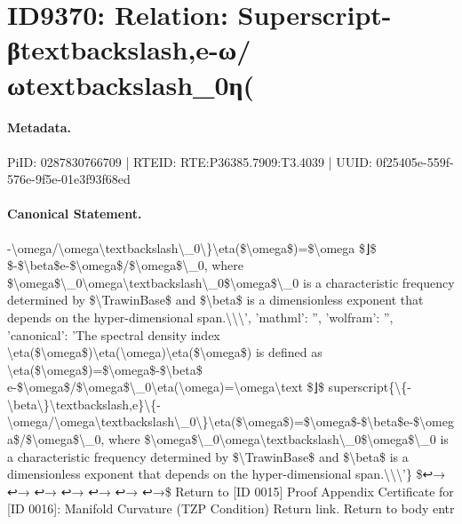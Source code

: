 \section*{ID9370: Relation: Superscript-βtextbackslash,e-ω/ωtextbackslash\_0η(}
\paragraph{Metadata.}
PiID: 0287830766709 | RTEID: RTE:P36385.7909:T3.4039 | UUID: 0f25405e-559f-576e-9f5e-01e3f93f68ed

\paragraph{Canonical Statement.}
-\textbackslash{}omega/\textbackslash{}omega\textbackslash{}textbackslash\textbackslash{}\_0\textbackslash{}\}\textbackslash{}eta(\$\textbackslash{}omega\$)=\$\textbackslash{}omega \$⌋\$ \$-\$\textbackslash{}beta\$e-\$\textbackslash{}omega\$/\$\textbackslash{}omega\$\textbackslash{}\_0, where \$\textbackslash{}omega\$\textbackslash{}\_0\textbackslash{}omega\textbackslash{}textbackslash\textbackslash{}\_0\$\textbackslash{}omega\$\textbackslash{}\_0 is a characteristic frequency determined by \$\textbackslash{}TrawinBase\$ and \$\textbackslash{}beta\$ is a dimensionless exponent that depends on the hyper-dimensional span.\textbackslash{}\textbackslash{}\textbackslash{}', 'mathml': '', 'wolfram': '', 'canonical': 'The spectral density index \textbackslash{}eta(\$\textbackslash{}omega\$)\textbackslash{}eta(\textbackslash{}omega)\textbackslash{}eta(\$\textbackslash{}omega\$) is defined as \textbackslash{}eta(\$\textbackslash{}omega\$)=\$\textbackslash{}omega\$-\$\textbackslash{}beta\$ e-\$\textbackslash{}omega\$/\$\textbackslash{}omega\$\textbackslash{}\_0\textbackslash{}eta(\textbackslash{}omega)=\textbackslash{}omega\textbackslash{}text \$⌋\$ superscript\{\textbackslash{}\{-\textbackslash{}beta\textbackslash{}\}\textbackslash{}textbackslash,e\}\textbackslash{}\{-\textbackslash{}omega/\textbackslash{}omega\textbackslash{}textbackslash\textbackslash{}\_0\textbackslash{}\}\textbackslash{}eta(\$\textbackslash{}omega\$)=\$\textbackslash{}omega\$-\$\textbackslash{}beta\$e-\$\textbackslash{}omega\$/\$\textbackslash{}omega\$\textbackslash{}\_0, where \$\textbackslash{}omega\$\textbackslash{}\_0\textbackslash{}omega\textbackslash{}textbackslash\textbackslash{}\_0\$\textbackslash{}omega\$\textbackslash{}\_0 is a characteristic frequency determined by \$\textbackslash{}TrawinBase\$ and \$\textbackslash{}beta\$ is a dimensionless exponent that depends on the hyper-dimensional span.\textbackslash{}\textbackslash{}\textbackslash{}'\} \$↩→ ↩→ ↩→ ↩→ ↩→ ↩→ ↩→\$ Return to [ID 0015] Proof Appendix Certificate for [ID 0016]: Manifold Curvature (TZP Condition) Return link. Return to body entr

